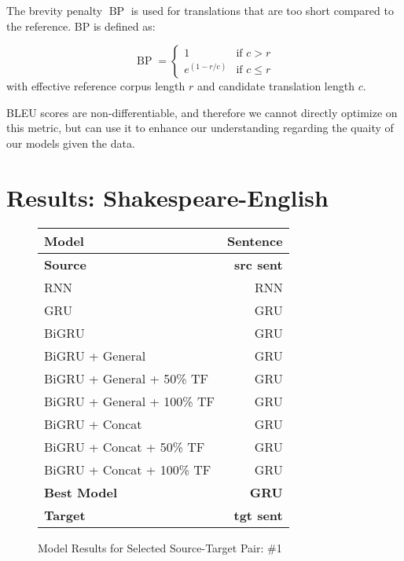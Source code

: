 \documentclass[twoside,twocolumn]{article}
\begin{document}
The brevity penalty $\operatorname{BP}$ is used for translations that are
too short compared to the reference. BP is defined as:

\begin{equation}
  \operatorname{BP} = \begin{cases}
    1 & \text{if } c > r \\
    e^{(1-r/c)} & \text{if } c \leq r
  \end{cases}
\end{equation}
\noindent
with effective reference corpus length $r$ and candidate translation length $c$.

BLEU scores are non-differentiable, and therefore we cannot directly optimize
on this metric, but can use it to enhance our understanding regarding the
quaity of our models given the data.

\section{Results: Shakespeare-English}
\label{sec:results}

\begin{figure*}
    \centering
    \begin{tabular}{ |l|r| }
        \hline
        \textbf{Model}
          & \textbf{Sentence} \\
        \hline
        \textbf{Source} & \textbf{src sent} \\ \hline
        RNN & RNN \\ \hline
        GRU & GRU \\ \hline
        BiGRU & GRU \\ \hline
        BiGRU + General & GRU \\ \hline
        BiGRU + General + 50\% TF & GRU \\ \hline
        BiGRU + General + 100\% TF & GRU \\ \hline
        BiGRU + Concat & GRU \\ \hline
        BiGRU + Concat + 50\% TF & GRU \\ \hline
        BiGRU + Concat + 100\% TF & GRU \\ \hline
        \textbf{Best Model} & \textbf{GRU} \\ \hline
        \textbf{Target} & \textbf{tgt sent} \\ \hline
    \end{tabular}

    \caption{Model Results for Selected Source-Target Pair: \#1}
    \label{fig:model-results}
\end{figure*}
\end{document}

